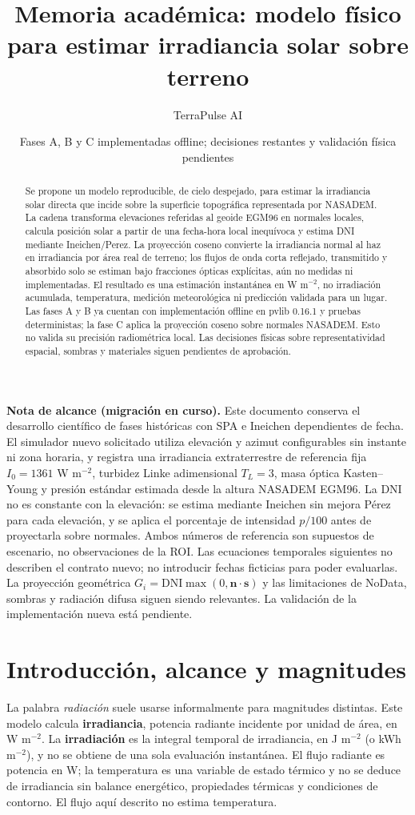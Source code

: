 \documentclass[11pt,a4paper]{article}
\title{Memoria académica: modelo físico para estimar irradiancia solar sobre terreno}
\author{TerraPulse AI}
\date{Fases A, B y C implementadas offline; decisiones restantes y validación física pendientes}
\begin{document}
\maketitle

\noindent\textbf{Nota de alcance (migración en curso).} Este documento conserva el desarrollo científico de fases históricas con SPA e Ineichen dependientes de fecha. El simulador nuevo solicitado utiliza elevación y azimut configurables sin instante ni zona horaria, y registra una irradiancia extraterrestre de referencia fija $I_0=1361$ W m$^{-2}$, turbidez Linke adimensional $T_L=3$, masa óptica Kasten--Young y presión estándar estimada desde la altura NASADEM EGM96. La DNI no es constante con la elevación: se estima mediante Ineichen sin mejora Pérez para cada elevación, y se aplica el porcentaje de intensidad $p/100$ antes de proyectarla sobre normales. Ambos números de referencia son supuestos de escenario, no observaciones de la ROI. Las ecuaciones temporales siguientes no describen el contrato nuevo; no introducir fechas ficticias para poder evaluarlas. La proyección geométrica $G_i=\mathrm{DNI}\max(0,\mathbf n\cdot\mathbf s)$ y las limitaciones de NoData, sombras y radiación difusa siguen siendo relevantes. La validación de la implementación nueva está pendiente.

\begin{abstract}
Se propone un modelo reproducible, de cielo despejado, para estimar la irradiancia solar directa que incide sobre la superficie topográfica representada por NASADEM. La cadena transforma elevaciones referidas al geoide EGM96 en normales locales, calcula posición solar a partir de una fecha-hora local inequívoca y estima DNI mediante Ineichen/Perez. La proyección coseno convierte la irradiancia normal al haz en irradiancia por área real de terreno; los flujos de onda corta reflejado, transmitido y absorbido solo se estiman bajo fracciones ópticas explícitas, aún no medidas ni implementadas. El resultado es una estimación instantánea en W m$^{-2}$, no irradiación acumulada, temperatura, medición meteorológica ni predicción validada para un lugar. Las fases A y B ya cuentan con implementación offline en pvlib 0.16.1 y pruebas deterministas; la fase C aplica la proyección coseno sobre normales NASADEM. Esto no valida su precisión radiométrica local. Las decisiones físicas sobre representatividad espacial, sombras y materiales siguen pendientes de aprobación.
\end{abstract}

\section{Introducción, alcance y magnitudes}
La palabra \emph{radiación} suele usarse informalmente para magnitudes distintas. Este modelo calcula \textbf{irradiancia}, potencia radiante incidente por unidad de área, en W m$^{-2}$. La \textbf{irradiación} es la integral temporal de irradiancia, en J m$^{-2}$ (o kWh m$^{-2}$), y no se obtiene de una sola evaluación instantánea. El flujo radiante es potencia en W; la temperatura es una variable de estado térmico y no se deduce de irradiancia sin balance energético, propiedades térmicas y condiciones de contorno. El flujo aquí descrito no estima temperatura.
\end{document}
